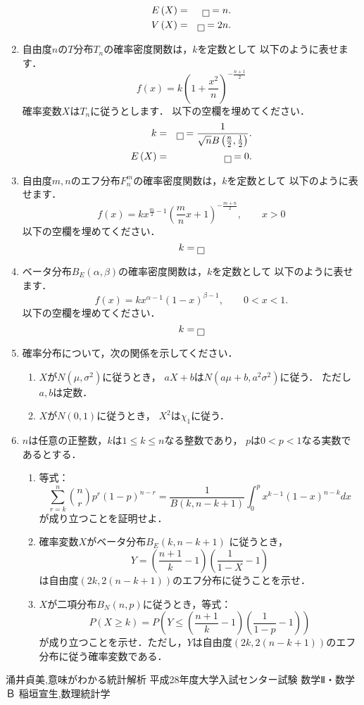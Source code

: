 \documentclass[12pt]{ltjsarticle}
\begin{document}
\begin{enumerate}
\begin{eqnarray*}
E\left(X\right)&=&\fbox{}=n. \\
V\left(X\right)&=&\fbox{}=2n.
\end{eqnarray*}
\item
自由度$n$の$T$分布$T_n$の確率密度関数は，$k$を定数として
以下のように表せます．
\[
f\left(x\right)=k\left(1+\frac{x^2}{n}\right)^{-\frac{n+1}{2}}
\]
確率変数$X$は$T_n$に従うとします．
以下の空欄を埋めてください．
\begin{eqnarray*}
k&=&\fbox{}=\frac{1}{\sqrt{n}B\left(\frac{n}{2},\frac{1}{2}\right)}. \\
E\left(X\right)&=&\fbox{}=0.
\end{eqnarray*}
\item
自由度$m,n$のエフ分布$F_n^m$の確率密度関数は，$k$を定数として
以下のように表せます．
\[
f\left(x\right)=kx^{\frac{m}{2}-1}\left(\frac{m}{n}x+1\right)^{-\frac{m+n}{2}}
,\qquad
x>0
\]
以下の空欄を埋めてください．
\[
k=\fbox{}
\]
\item
ベータ分布$B_E\left(\alpha,\beta\right)$の確率密度関数は，$k$を定数として
以下のように表せます．
\[
f\left(x\right)=kx^{\alpha-1}\left(1-x\right)^{\beta-1},\qquad
0<x<1.
\]
以下の空欄を埋めてください．
\[
k=\fbox{}
\]
\item
確率分布について，次の関係を示してください．
\begin{enumerate}
\item
$X$が$N\left(\mu,\sigma^2\right)$に従うとき，
$aX+b$は$N\left(a\mu+b,a^2\sigma^2\right)$に従う．
ただし$a,b$は定数．
\item
$X$が$N\left(0,1\right)$に従うとき，
$X^2$は$\chi_1$に従う．
\end{enumerate}
\item
$n$は任意の正整数，$k$は$1\le k\le n$なる整数であり，
$p$は$0<p<1$なる実数であるとする．
\begin{enumerate}
\item
等式：
\[
\sum_{r=k}^{n}\binom{n}{r}p^r\left(1-p\right)^{n-r}=
\frac{1}{B\left(k,n-k+1\right)}\int_0^p x^{k-1}\left(1-x\right)^{n-k}dx
\]
が成り立つことを証明せよ．
\cite[p.47]{inagaki}
\item
確率変数$X$がベータ分布$B_E\left(k,n-k+1\right)$
に従うとき，$$ Y=\left(\frac{n+1}{k}-1\right)\left(\frac{1}{1-X}-1\right)$$
は自由度$\left(2k,
2\left(n-k+1\right)\right)$のエフ分布に従うことを示せ．
\cite[p.106]{inagaki}
\item
$X$が二項分布$B_N\left(n,p\right)$に従うとき，等式：
\[
P\left(X \ge k\right)=
P\left(Y\le \left(\frac{n+1}{k}-1\right)\left(\frac{1}{1-p}-1\right)\right)
\]
が成り立つことを示せ．ただし，$Y$は自由度$\left(2k,
2\left(n-k+1\right)\right)$のエフ分布に従う確率変数である．
\cite[p.106]{inagaki}
\end{enumerate}
\end{enumerate}
\begin{thebibliography}{9}
 涌井貞美,意味がわかる統計解析
 平成28年度大学入試センター試験 数学Ⅱ・数学Ｂ
 稲垣宣生,数理統計学
\end{thebibliography}
\end{document}
